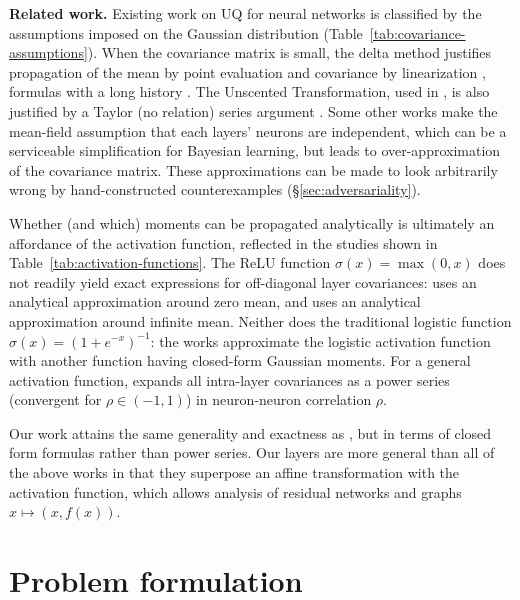 \documentclass{article}
\begin{document}
\textbf{Related work.}
Existing work on UQ for neural networks is classified by the assumptions imposed on the Gaussian distribution (Table~\ref{tab:covariance-assumptions}).
When the covariance matrix is small, the delta method justifies propagation of the mean by point evaluation and covariance by linearization \cite{titensky_uncertainty_2018,nagel_kalman-bucy-informed_2022,petersen_uncertainty_2024,jungmann_analytical_2025}, formulas with a long history \citep[Chapter 187]{gauss_theory_1857} \citep{taylor_introduction_1997}.
The Unscented Transformation, used in \citet{astudillo_propagation_2011,abdelaziz_uncertainty_2015}, is also justified by a Taylor (no relation) series argument \citep{julier_scaled_2002}.
Some other works \citep{huber_bayesian_2020,wagner_kalman_2022,akgul_deterministic_2025} make the mean-field assumption that each layers' neurons are independent, which can be a serviceable simplification for Bayesian learning, but leads to over-approximation of the covariance matrix.
These approximations can be made to look arbitrarily wrong by hand-constructed counterexamples (\S\ref{sec:adversariality}).


Whether (and which) moments can be propagated analytically is ultimately an affordance of the activation function, reflected in the studies shown in Table~\ref{tab:activation-functions}.
The ReLU function \(\sigma(x) = \max(0, x)\) does not readily yield exact expressions for off-diagonal layer covariances:
\citet{bibi_analytic_2018} uses an analytical approximation around zero mean, and \citet{wu_deterministic_2019} uses an analytical approximation around infinite mean.
Neither does the traditional logistic function \(\sigma(x) = (1 + e^{-x})^{-1}\):
the works  \citet{astudillo_propagation_2011,abdelaziz_uncertainty_2015,huber_bayesian_2020} approximate the logistic activation function with another function having closed-form Gaussian moments.
For a general activation function, 
\citet{wright_analytic_2024} expands all intra-layer covariances as a power series (convergent for \(\rho \in (-1, 1)\)) in neuron-neuron correlation \(\rho\).

Our work attains the same generality and exactness as \citet{wright_analytic_2024}, but in terms of closed form formulas rather than power series.
Our layers are more general than all of the above works in that they superpose an affine transformation with the activation function, which allows analysis of residual networks and graphs \(x \mapsto (x, f(x))\).

\section{Problem formulation}
\end{document}
